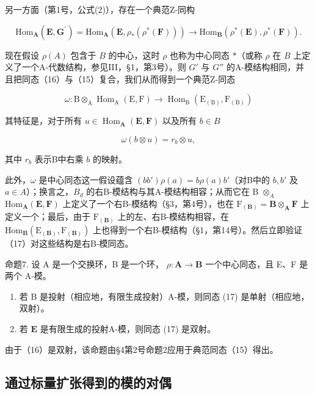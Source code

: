 另一方面（第1号，公式(2)），存在一个典范Z-同构

\[
\mathrm{Hom} _ {\mathbf {A}} (\mathbf {E}, \mathbf {G} ^ {\prime}) = \mathrm{Hom} _ {\mathbf {A}} (\mathbf {E}, \rho_ {*} (\rho^ {*} (\mathbf {F}))) \rightarrow \mathrm{Hom} _ {\mathbf {B}} (\rho^ {*} (\mathbf {E}), \rho^ {*} (\mathbf {F})). \tag {16}
\]

现在假设 \(\rho(A)\) 包含于 \(B\) 的中心，这时 \(\rho\) 也称为中心同态 \(*\)（或称 \(\rho\) 在 \(B\) 上定义了一个A-代数结构，参见III，§1，第3号）。则 \(G'\) 与 \(G''\) 的A-模结构相同，并且把同态（16）与（15）复合，我们从而得到一个典范Z-同态

\[
\omega : \mathrm{B} \otimes_ {\mathrm{A}} \operatorname{Hom} _ {\mathrm{A}} (\mathrm{E}, \mathrm{F}) \rightarrow \operatorname{Hom} _ {\mathrm{B}} \left(\mathrm{E} _ {(\mathrm{B})}, \mathrm{F} _ {(\mathrm{B})}\right)\tag{17}
\]

其特征是，对于所有 \(u \in \operatorname{Hom}_{\mathbf{A}}(\mathbf{E}, \mathbf{F})\) 以及所有 \(b \in B\)

\[
\omega (b \otimes u) = r _ {b} \otimes u,\tag{18}
\]

其中 \(r_b\) 表示B中右乘 \(b\) 的映射。

此外，\(\omega\) 是中心同态这一假设蕴含 \((bb')\rho(a) = b\rho(a)b'\)（对B中的 \(b, b'\) 及 \(a \in A\)）；换言之，\(B_d\) 的右B-模结构与其A-模结构相容；从而它在 B \(\otimes_A\) \(\mathrm{Hom}_{\mathbf{A}}(\mathbf{E}, \mathbf{F})\) 上定义了一个右B-模结构（§3，第4号），也在 \(\mathrm{F}_{(\mathbf{B})} = \mathbf{B} \otimes_{\mathbf{A}} \mathbf{F}\) 上定义一个；最后，由于 \(\mathrm{F}_{(\mathbf{B})}\) 上的左、右B-模结构相容，在 \(\mathrm{Hom}_{\mathbf{B}}(\mathrm{E}_{(\mathbf{B})}, \mathrm{F}_{(\mathbf{B})})\) 上也得到一个右B-模结构（§1，第14号）。然后立即验证（17）对这些结构是右B-模同态。

命题7. 设 A 是一个交换环，B 是一个环， \(\rho: \mathbf{A} \to \mathbf{B}\) 一个中心同态，且 E、F 是两个 A-模。

\begin{enumerate}
\def\labelenumi{(\roman{enumi})}
\item
  若 B 是投射（相应地，有限生成投射）A-模，则同态 (17) 是单射（相应地，双射）。
\item
  若 \(\mathbf{E}\) 是有限生成的投射A-模，则同态 (17) 是双射。
\end{enumerate}

由于（16）是双射，该命题由§4第2号命题2应用于典范同态（15）得出。

\subsection{通过标量扩张得到的模的对偶}


